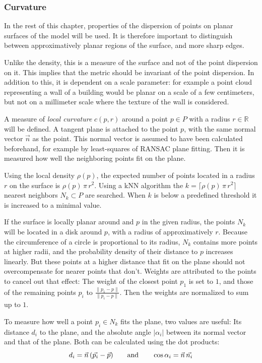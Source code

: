 \subsubsection{Curvature}
In the rest of this chapter, properties of the dispersion of points on planar surfaces of the model will be used. It is therefore important to distinguish between approximatively planar regions of the surface, and more sharp edges.

Unlike the density, this is a measure of the surface and not of the point dispersion on it. This implies that the metric should be invariant of the point dispersion. In addition to this, it is dependent on a scale parameter: for example a point cloud representing a wall of a building would be planar on a scale of a few centimeters, but not on a millimeter scale where the texture of the wall is considered.

A measure of \emph{local curvature} $c(p, r)$ around a point $p \in P$ with a radius $r \in \mathbb{R}$ will be defined. A tangent plane is attached to the point $p$, with the same normal vector $\vec{n}$ as the point. This normal vector is assumed to have been calculated beforehand, for example by least-squares of RANSAC plane fitting. Then it is measured how well the neighboring points fit on the plane.

Using the local density $\rho(p)$, the expected number of points located in a radius $r$ on the surface is $\rho(p) \, \pi \, r^2$. Using a kNN algorithm the $k = \lceil \rho(p) \, \pi \, r^2 \rceil$ nearest neighbors $N_k \subset P$ are searched. When $k$ is below a predefined threshold it is increased to a minimal value. 

If the surface is locally planar around and $p$ in the given radius, the points $N_k$ will be located in a disk around $p$, with a radius of approximatively $r$. Because the circumference of a circle is proportional to its radius, $N_k$ contains more points at higher radii, and the probability density of their distance to $p$ increases linearly. But these points at a higher distance that fit on the plane should not overcompensate for nearer points that don't. Weights are attributed to the points to cancel out that effect: The weight of the closest point $p_1$ is set to $1$, and those of the remaining points $p_i$ to $\frac{\| p_1 - p \|}{\| p_i - p \|}$. Then the weights are normalized to sum up to $1$.

To measure how well a point $p_i \in N_k$ fits the plane, two values are useful: Its distance $d_i$ to the plane, and the absolute angle $|\alpha_i|$ between its normal vector and that of the plane. Both can be calculated using the dot products:
\begin{equation}
d_i = \vec{n} \, (\vec{p_i} - \vec{p})
\hspace{7mm} \text{and} \hspace{7mm}
\cos \alpha_i = \vec{n} \, \vec{n_i}
\end{equation}

